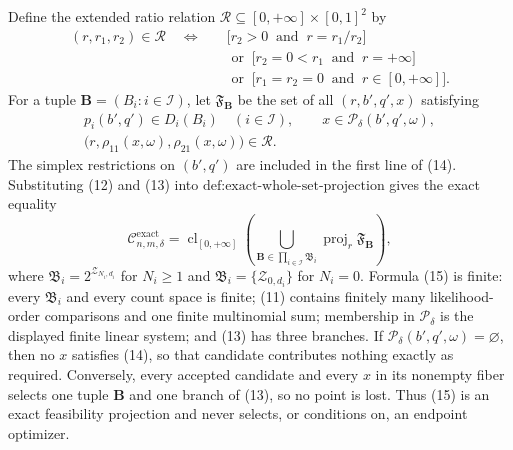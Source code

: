 Define the extended ratio relation \(\mathscr R\subseteq[0,+\infty]\times[0,1]^2\) by
\[
 \begin{aligned}
 (r,r_1,r_2)\in\mathscr R\quad\Longleftrightarrow\quad
 &\bigl[r_2>0\ \text{ and }\ r=r_1/r_2\bigr]\\
 &{}\text{ or }\ \bigl[r_2=0<r_1\ \text{ and }\ r=+\infty\bigr]\\
 &{}\text{ or }\ \bigl[r_1=r_2=0\ \text{ and }\ r\in[0,+\infty]\bigr]. \tag{13}
 \end{aligned}
\]
For a tuple \(\mathbf B=(B_i:i\in\mathcal I)\), let \(\mathfrak F_{\mathbf B}\) be the set of all \((r,b',q',x)\) satisfying
\[
 \begin{gathered}
 p_i(b',q')\in D_i(B_i)\quad(i\in\mathcal I),
 \qquad x\in\mathcal P_\delta(b',q',\omega),\\
 \bigl(r,\rho_{11}(x,\omega),\rho_{21}(x,\omega)\bigr)\in\mathscr R. \tag{14}
 \end{gathered}
\]
The simplex restrictions on \((b',q')\) are included in the first line of (14). Substituting (12) and (13) into \(\text{def:exact-whole-set-projection}\) gives the exact equality
\[
 \mathcal C_{n,m,\delta}^{\mathrm{exact}}
 =\operatorname{cl}_{[0,+\infty]}
   \left(
     \bigcup_{\mathbf B\in\prod_{i\in\mathcal I}\mathfrak B_i}
     \operatorname{proj}_r\mathfrak F_{\mathbf B}
   \right), \tag{15}
\]
where \(\mathfrak B_i=2^{\mathcal Z_{N_i,d_i}}\) for \(N_i\geq1\) and \(\mathfrak B_i=\{\mathcal Z_{0,d_i}\}\) for \(N_i=0\). Formula (15) is finite: every \(\mathfrak B_i\) and every count space is finite; (11) contains finitely many likelihood-order comparisons and one finite multinomial sum; membership in \(\mathcal P_\delta\) is the displayed finite linear system; and (13) has three branches. If \(\mathcal P_\delta(b',q',\omega)=\varnothing\), then no \(x\) satisfies (14), so that candidate contributes nothing exactly as required. Conversely, every accepted candidate and every \(x\) in its nonempty fiber selects one tuple \(\mathbf B\) and one branch of (13), so no point is lost. Thus (15) is an exact feasibility projection and never selects, or conditions on, an endpoint optimizer.
